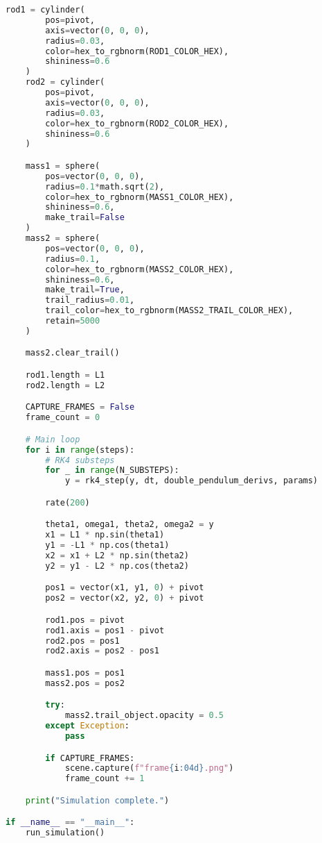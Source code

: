 \documentclass[letterpaper,12pt]{article}
\begin{document}
\begin{enumerate}[leftmargin=*, itemsep=1em]
\begin{lstlisting}[language=Python, caption=Double Pendulum Simulation with Pastel Palette, label=lst:doublependulum]
    rod1 = cylinder(
        pos=pivot,
        axis=vector(0, 0, 0),
        radius=0.03,
        color=hex_to_rgbnorm(ROD1_COLOR_HEX),
        shininess=0.6
    )
    rod2 = cylinder(
        pos=pivot,
        axis=vector(0, 0, 0),
        radius=0.03,
        color=hex_to_rgbnorm(ROD2_COLOR_HEX),
        shininess=0.6
    )

    mass1 = sphere(
        pos=vector(0, 0, 0),
        radius=0.1*math.sqrt(2),
        color=hex_to_rgbnorm(MASS1_COLOR_HEX),
        shininess=0.6,
        make_trail=False
    )
    mass2 = sphere(
        pos=vector(0, 0, 0),
        radius=0.1,
        color=hex_to_rgbnorm(MASS2_COLOR_HEX),
        shininess=0.6,
        make_trail=True,
        trail_radius=0.01,
        trail_color=hex_to_rgbnorm(MASS2_TRAIL_COLOR_HEX),
        retain=5000
    )

    mass2.clear_trail()

    rod1.length = L1
    rod2.length = L2

    CAPTURE_FRAMES = False
    frame_count = 0

    # Main loop
    for i in range(steps):
        # RK4 substeps
        for _ in range(N_SUBSTEPS):
            y = rk4_step(y, dt, double_pendulum_derivs, params)

        rate(200)

        theta1, omega1, theta2, omega2 = y
        x1 = L1 * np.sin(theta1)
        y1 = -L1 * np.cos(theta1)
        x2 = x1 + L2 * np.sin(theta2)
        y2 = y1 - L2 * np.cos(theta2)

        pos1 = vector(x1, y1, 0) + pivot
        pos2 = vector(x2, y2, 0) + pivot

        rod1.pos = pivot
        rod1.axis = pos1 - pivot
        rod2.pos = pos1
        rod2.axis = pos2 - pos1

        mass1.pos = pos1
        mass2.pos = pos2

        try:
            mass2.trail_object.opacity = 0.5
        except Exception:
            pass

        if CAPTURE_FRAMES:
            scene.capture(f"frame{i:04d}.png")
            frame_count += 1

    print("Simulation complete.")

if __name__ == "__main__":
    run_simulation()
\end{lstlisting}


\end{enumerate}
\end{document}
